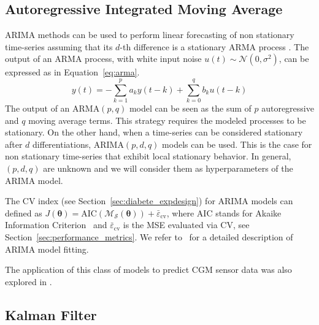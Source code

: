 \subsection{Autoregressive Integrated Moving Average}
ARIMA methods can be used to perform linear forecasting of non stationary time-series assuming that its $d$-th difference is a stationary ARMA process  \cite{box2015time}. The output of an ARMA process, with white input noise $u(t)\sim\mathcal{N}(0,\sigma^2)$, can be expressed as in Equation~\eqref{eq:arma}.
\begin{equation} \label{eq:arma}
y(t) = -\sum_{k=1}^pa_ky(t-k)+\sum_{k=0}^qb_ku(t-k)
\end{equation}
The output of an ARMA$(p, q)$ model can be seen as the sum of $p$ autoregressive and $q$ moving average terms. This strategy requires the modeled processes to be stationary. On the other hand, when a time-series can be considered stationary after $d$ differentiations, ARIMA$(p, d, q)$ models can be used. 
This is the case for non stationary time-series that exhibit local stationary behavior. In general,  $(p, d, q)$ are unknown and we will consider them as hyperparameters of the ARIMA model.

The CV index (see Section~\ref{sec:diabete_expdesign}) for ARIMA models can defined as $J(\bm{\theta})= \text{AIC}(\mathcal{M}_{\mathcal{S}}(\bm{\theta})) + \bar{\varepsilon}_{\text{cv}}$, where AIC stands for Akaike Information Criterion~ \cite{box2015time} and $\bar{\varepsilon}_{\text{cv}}$ is the MSE evaluated via CV, see Section~\ref{sec:performance_metrics}. We refer to~\cite{box2015time} for a detailed description of ARIMA model fitting.

The application of this class of models to predict CGM sensor data was also explored in \cite{sparacino2007glucose,bunescu2013blood}.

\subsection{Kalman Filter}


